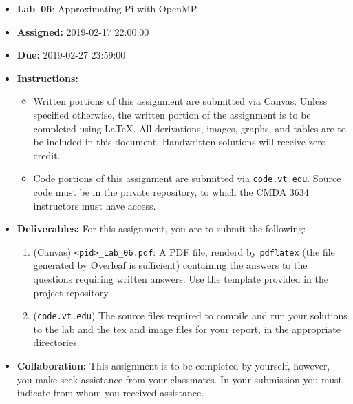 \documentclass[letter]{article}
\title{\coursenumber \coursecrn}
\date{}
\newcommand{\assignmenttype}{Lab}
\newcommand{\assignmentnumber}{06}
\newcommand{\assignmentreleasedate}{2019-02-17 22:00:00}
\newcommand{\assignmentduedate}{2019-02-27 23:59:00}
\newcommand{\assignmenttitle}{Approximating Pi with OpenMP}
\begin{document}
\thispagestyle{fancy}%

\begin{itemize}[leftmargin=*]
    \item[] \textbf{\assignmenttype~\assignmentnumber}: \assignmenttitle
    \item[] \textbf{Assigned: } \assignmentreleasedate
    \item[] \textbf{Due: } \assignmentduedate
    \item[] \textbf{Instructions: }
        \begin{itemize}
            \item Written portions of this assignment are submitted via Canvas.  Unless specified otherwise, the written portion of the assignment is to be completed using LaTeX.  All derivations, images, graphs, and tables are to be included in this document.  Handwritten solutions will receive zero credit.
            \item Code portions of this assignment are submitted via \texttt{code.vt.edu}.  Source code must be in the private repository, to which the CMDA 3634 instructors must have access.
        \end{itemize}
    \item[] \textbf{Deliverables:} For this assignment, you are to submit the following:
        \begin{enumerate}
            \item (Canvas) \texttt{<pid>\_\assignmenttype\_06.pdf}: A PDF file, renderd by \texttt{pdflatex} (the file generated by Overleaf is sufficient) containing the answers to the questions requiring written answers.  Use the template provided in the project repository. 
            \item (\texttt{code.vt.edu}) The source files required to compile and run your solutions to the lab and the tex and image files for your report, in the appropriate directories.
        \end{enumerate}
    \item[] \textbf{Collaboration: } This assignment is to be completed by yourself, however, you make seek assistance from your classmates.  In your submission you must indicate from whom you received assistance.

\end{itemize}
\end{document}
